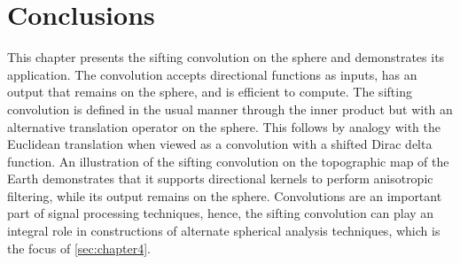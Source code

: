 



\section{Conclusions}\label{sec:chapter3_conclusions}

This chapter presents the sifting convolution on the sphere and demonstrates its application.
The convolution accepts directional functions as inputs, has an output that remains on the sphere, and is efficient to compute.
The sifting convolution is defined in the usual manner through the inner product but with an alternative translation operator on the sphere.
This follows by analogy with the Euclidean translation when viewed as a convolution with a shifted Dirac delta function.
An illustration of the sifting convolution on the topographic map of the Earth demonstrates that it supports directional kernels to perform anisotropic filtering, while its output remains on the sphere.
Convolutions are an important part of signal processing techniques, hence, the sifting convolution can play an integral role in constructions of alternate spherical analysis techniques, which is the focus of \cref{sec:chapter4}.
